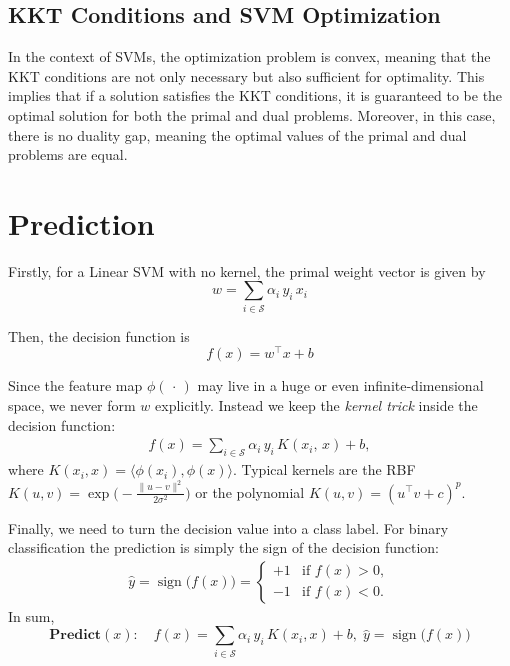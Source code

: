 \subsection{KKT Conditions and SVM Optimization}

In the context of SVMs, the optimization problem is convex, meaning that the KKT conditions are not only necessary but also sufficient for optimality. This implies that if a solution satisfies the KKT conditions, it is guaranteed to be the optimal solution for both the primal and dual problems. Moreover, in this case, there is no duality gap, meaning the optimal values of the primal and dual problems are equal.

\section{Prediction}

Firstly, for a Linear SVM with no kernel, the primal weight vector is given by
$$ w=\sum_{i\in \mathcal S}\alpha_i\,y_i\,x_i $$

Then, the decision function is
$$ f(x)=w^{\!\top}x + b $$

Since the feature map $\phi(\,\cdot\,)$ may live in a huge or even infinite-dimensional space, we never form $w$ explicitly. Instead we keep the \textit{kernel trick} inside the decision function:
\begin{align*}
	f(x)=\sum_{i\in\mathcal S}\alpha_i\,y_i\,K(x_i,\,x)+b,
\end{align*}
where $K(x_i,x)=\langle\phi(x_i),\phi(x)\rangle$.
Typical kernels are the RBF $K(u,v)=\exp\!\bigl(-\frac{\|u-v\|^2}{2\sigma^2}\bigr)$ or the polynomial $K(u,v)=(u^{\!\top}v+c)^p$.

Finally, we need to turn the decision value into a class label. For binary classification the prediction is simply the sign of the decision function:
\begin{align*}
	\hat y = \operatorname{sign}\bigl(f(x)\bigr) = 
	\begin{cases}
	+1 &\text{if }f(x)\gt 0,\\[4pt]
	-1 &\text{if }f(x)\lt 0.
	\end{cases}
\end{align*}
In sum,
$$
\textbf{Predict}(x):
\quad f(x)=\sum_{i\in\mathcal S}\alpha_i\,y_i\,K(x_i,x)+b,\;
\hat y=\operatorname{sign}\bigl(f(x)\bigr)
$$


